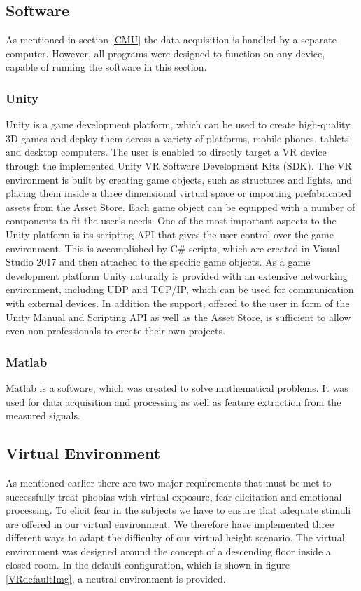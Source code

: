 \newpage
\subsection{Software}
As mentioned in section \ref{CMU} the data acquisition is handled by a separate computer. However, all programs were designed to function on any device, capable of running the software in this section. 

\subsubsection{Unity}
Unity is a game development platform, which can be used to create high-quality 3D games and deploy them across a variety of platforms, mobile phones, tablets and desktop computers. The user is enabled to directly target a VR device through the implemented Unity VR Software Development Kits (SDK). The VR environment is built by creating game objects, such as structures and lights, and placing them inside a three dimensional virtual space or importing prefabricated assets from the Asset Store. Each game object can be equipped with a number of components to fit the user's needs. One of the most important aspects to the Unity platform is its scripting API that gives the user control over the game environment. This is accomplished by C\# scripts, which are created in Visual Studio 2017 and then attached to the specific game objects. As a game development platform Unity naturally is provided with an extensive networking environment, including UDP and TCP/IP, which can be used for communication with external devices. In addition the support, offered to the user in form of the Unity Manual and Scripting API as well as the Asset Store, is sufficient to allow even non-professionals to create their own projects.

\subsubsection{Matlab}
Matlab is a software, which was created to solve mathematical problems. It was used for data acquisition and processing as well as feature extraction from the measured signals.

\subsection{Virtual Environment}
As mentioned earlier there are two major requirements that must be met to successfully treat phobias with virtual exposure, fear elicitation and emotional processing. To elicit fear in the subjects we have to ensure that adequate stimuli are offered in our virtual environment. We therefore have implemented three different ways to adapt the difficulty of our virtual height scenario. The virtual environment was designed around the concept of a descending floor inside a closed room. In the default configuration, which is shown in figure \ref{VRdefaultImg}, a neutral environment is provided.

